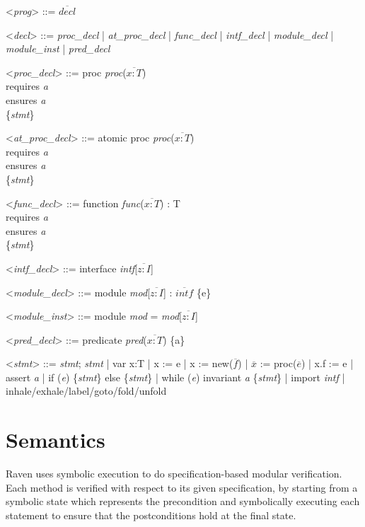 \documentclass{article}
\begin{document}
	\begin{grammar}
	\let\syntleft\relax
	\let\syntright\relax

		
	<\textit{prog}> ::= $\overline{decl}$
	
	<\textit{decl}> ::= \textit{proc\_decl} | \textit{at\_proc\_decl} | \textit{func\_decl} | \textit{intf\_decl} | \textit{module\_decl} | \textit{module\_inst} | \textit{pred\_decl}
	
	<\textit{proc\_decl}> ::=  proc \textit{proc}($\overline{x : T}$) \\
		requires \textit{a} \\
		ensures \textit{a} \\
		\{\textit{stmt}\}
		
	<\textit{at\_proc\_decl}> ::= atomic proc \textit{proc}($\overline{x : T}$) \\
	requires \textit{a} \\
	ensures \textit{a} \\
	\{\textit{stmt}\}
	
	<\textit{func\_decl}> ::= function \textit{func}($\overline{x : T}$) : T\\
	requires \textit{a} \\
	ensures \textit{a} \\
	\{\textit{stmt}\}
	
	<\textit{intf\_decl}> ::= interface \textit{intf}[$\overline{z : I}$] 
	
	<\textit{module\_decl}> ::= module \textit{mod}[$\overline{z : I}$] : $\overline{\textit{intf}}$ \{e\}
	
	<\textit{module\_inst}> ::= module \textit{mod} = \textit{mod}[$\overline{z : I}$]
	
	<\textit{pred\_decl}> ::= predicate \textit{pred}($\overline{x : T}$) \{a\}
	
	<\textit{stmt}> ::= \textit{stmt}; \textit{stmt} | var x:T | x := e | x := new($\overline{f}$) | $\overline{x}$ := proc($\overline{e}$) | x.f := e | assert \textit{a} | if (\textit{e}) \{\textit{stmt}\} else \{\textit{stmt}\} | while (\textit{e}) invariant \textit{a} \{\textit{stmt}\} | import \textit{intf} | inhale/exhale/label/goto/fold/unfold
		
\end{grammar}

\section{Semantics}
Raven uses symbolic execution to do specification-based modular verification. Each method is verified with respect to its given specification, by starting from a symbolic state which represents the precondition and symbolically executing each statement to ensure that the postconditions hold at the final state.
\end{document}
